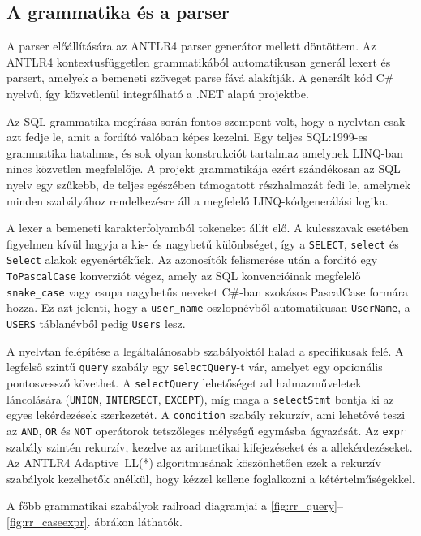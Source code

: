 \documentclass[a4paper,12pt]{article}
\begin{document}
\subsection{A grammatika és a parser}

A parser előállítására az ANTLR4 parser generátor mellett döntöttem. Az ANTLR4 kontextusfüggetlen grammatikából automatikusan generál lexert és parsert, amelyek a bemeneti szöveget parse fává alakítják. A generált kód C\# nyelvű, így közvetlenül integrálható a .NET alapú projektbe.

Az SQL grammatika megírása során fontos szempont volt, hogy a nyelvtan csak azt fedje le, amit a fordító valóban képes kezelni. Egy teljes SQL:1999-es grammatika hatalmas, és sok olyan konstrukciót tartalmaz amelynek LINQ-ban nincs közvetlen megfelelője. A projekt grammatikája ezért szándékosan az SQL nyelv egy szűkebb, de teljes egészében támogatott részhalmazát fedi le, amelynek minden szabályához rendelkezésre áll a megfelelő LINQ-kódgenerálási logika.

A lexer a bemeneti karakterfolyamból tokeneket állít elő. A kulcsszavak esetében figyelmen kívül hagyja a kis- és nagybetű különbséget, így a \texttt{SELECT}, \texttt{select} és \texttt{Select} alakok egyenértékűek. Az azonosítók felismerése után a fordító egy \texttt{ToPascalCase} konverziót végez, amely az SQL konvencióinak megfelelő \texttt{snake\_case} vagy csupa nagybetűs neveket C\#-ban szokásos PascalCase formára hozza. Ez azt jelenti, hogy a \texttt{user\_name} oszlopnévből automatikusan \texttt{UserName}, a \texttt{USERS} táblanévből pedig \texttt{Users} lesz.

A nyelvtan felépítése a legáltalánosabb szabályoktól halad a specifikusak felé. A legfelső szintű \texttt{query} szabály egy \texttt{selectQuery}-t vár, amelyet egy opcionális pontosvessző követhet. A \texttt{selectQuery} lehetőséget ad halmazműveletek láncolására (\texttt{UNION}, \texttt{INTERSECT}, \texttt{EXCEPT}), míg maga a \texttt{selectStmt} bontja ki az egyes lekérdezések szerkezetét. A \texttt{condition} szabály rekurzív, ami lehetővé teszi az \texttt{AND}, \texttt{OR} és \texttt{NOT} operátorok tetszőleges mélységű egymásba ágyazását. Az \texttt{expr} szabály szintén rekurzív, kezelve az aritmetikai kifejezéseket és a allekérdezéseket. Az ANTLR4 Adaptive~LL(*) algoritmusának köszönhetően ezek a rekurzív szabályok kezelhetők anélkül, hogy kézzel kellene foglalkozni a kétértelműségekkel.

A főbb grammatikai szabályok railroad diagramjai a \ref{fig:rr_query}--\ref{fig:rr_caseexpr}. ábrákon láthatók.
\end{document}
